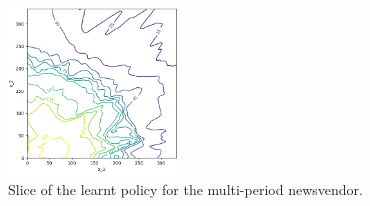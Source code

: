 \begin{figure}[htbp]
\centering
        \includegraphics[width=0.4\textwidth]{images/newsvendor_policy.png}
    \caption{Slice of the learnt policy for the multi-period newsvendor.}
    \label{fig:newsvendor_policy}
    	\vspace{-1em}
\end{figure}
